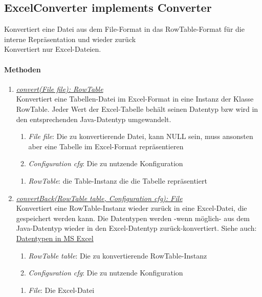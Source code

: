 \subsection{ExcelConverter implements Converter}
Konvertiert eine Datei aus dem File-Format in das RowTable-Format für die interne Repräsentation und wieder zurück \\

Konvertiert nur Excel-Dateien. \\

\paragraph{Methoden}
\begin{enumerate}[+]
	\item \underline{\textit{convert(File file): RowTable}} \\
	Konvertiert eine Tabellen-Datei im Excel-Format in eine Instanz der Klasse RowTable.
	Jeder Wert der Excel-Tabelle behält seinen Datentyp bzw wird in den entsprechenden Java-Datentyp umgewandelt.
	
	\begin{enumerate}[$\bullet$]
		\item \textit{File file}: Die zu konvertierende Datei, kann NULL sein, muss ansonsten aber eine Tabelle im Excel-Format repräsentieren
		\item \textit{Configuration cfg}: Die zu nutzende Konfiguration
	\end{enumerate}
	\vspace{-0.2cm}
	\begin{enumerate}[$\circ$]
		\item \textit{RowTable}: die Table-Instanz die die Tabelle repräsentiert
	\end{enumerate}
	
	\item \underline{\textit{convertBack(RowTable table, Configuration cfg): File}} \\
	Konvertiert eine RowTable-Instanz wieder zurück in eine Excel-Datei, die gespeichert werden kann.
	Die Datentypen werden -wenn möglich- aus dem Java-Datentyp wieder in den Excel-Datentyp zurück-konvertiert.
	Siehe auch: \href{https://support.office.com/en-us/article/data-types-in-data-models-e2388f62-6122-4e2b-bcad-053e3da9ba90#__toc327893213}{Datentypen in MS Excel}
	\begin{enumerate}[$\bullet$]
		\item \textit{RowTable table}: Die zu konvertierende RowTable-Instanz
		\item \textit{Configuration cfg}: Die zu nutzende Konfiguration
	\end{enumerate}
	\vspace{-0.2cm}
	\begin{enumerate}[$\circ$]
		\item \textit{File}: Die Excel-Datei
	\end{enumerate}
\end{enumerate}
